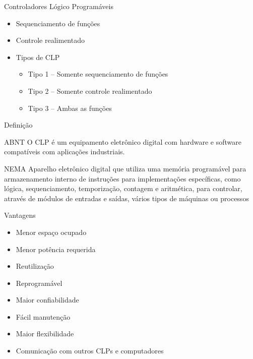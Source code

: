 \documentclass[aspectratio=169,
				xcolor=table]{beamer}
\begin{document}
	\begin{frame}{Controladores Lógico Programáveis}
		\begin{itemize}
			\item Sequenciamento de funções 
			\vspace{1em}
			\item Controle realimentado
			\vspace{1em}
			\item Tipos de CLP
			\begin{itemize}
				\item Tipo 1 – Somente sequenciamento de funções
				\item Tipo 2 – Somente controle realimentado
				\item Tipo 3 – Ambas as funções
			\end{itemize}
		\end{itemize}
	\end{frame}
	
	\begin{frame}{Definição}
		\begin{block}{ABNT}
			O CLP é um equipamento eletrônico digital com  hardware e  software compatíveis com aplicações industriais.
		\end{block}

		\begin{block}{NEMA}
			Aparelho  eletrônico  digital  que  utiliza  uma  memória programável  para armazenamento  interno  de  instruções  para  implementações  específicas,  como  lógica, sequenciamento, temporização, contagem e aritmética, para controlar, através de módulos de entradas e saídas, vários tipos de máquinas ou processos

		\end{block}
	\end{frame}
	
	\begin{frame}{Vantagens}
		\begin{itemize}
	
			\item Menor espaço ocupado
			\vspace{.6em}
			\item Menor potência requerida
			\vspace{.6em}
			\item Reutilização
			\vspace{.6em}
			\item Reprogramável
			\vspace{.6em}
			\item Maior confiabilidade
			\vspace{.6em}
			\item Fácil manutenção
			\vspace{.6em}
			\item Maior flexibilidade
			\vspace{.6em}
			\item Comunicação com outros CLPs e computadores
	
		\end{itemize}
	\end{frame}
\end{document}

